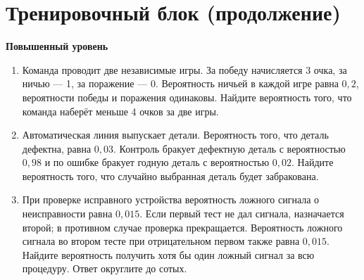 \documentclass[a4paper,12pt]{article}
\begin{document}
\section*{Тренировочный блок (продолжение)}
\textcolor{darkaccent}{\textbf{Повышенный уровень}}
\begin{enumerate}[start=8]
\item Команда проводит две независимые игры. За победу начисляется 3 очка, за ничью — 1, за поражение — 0. Вероятность ничьей в каждой игре равна $0,2$, вероятности победы и поражения одинаковы. Найдите вероятность того, что команда наберёт меньше 4 очков за две игры.
\vspace{17mm}
\item Автоматическая линия выпускает детали. Вероятность того, что деталь дефектна, равна $0,03$. Контроль бракует дефектную деталь с вероятностью $0,98$ и по ошибке бракует годную деталь с вероятностью $0,02$. Найдите вероятность того, что случайно выбранная деталь будет забракована.
\vspace{17mm}
\item При проверке исправного устройства вероятность ложного сигнала о неисправности равна $0,015$. Если первый тест не дал сигнала, назначается второй; в противном случае проверка прекращается. Вероятность ложного сигнала во втором тесте при отрицательном первом также равна $0,015$. Найдите вероятность получить хотя бы один ложный сигнал за всю процедуру. Ответ округлите до сотых.
\end{enumerate}

\clearpage
\end{document}

